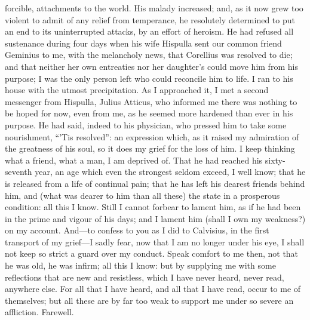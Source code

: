 forcible, attachments to the world. His malady increased; and, as it now
grew too violent to admit of any relief from temperance, he resolutely
determined to put an end to its uninterrupted attacks, by an effort of
heroism. He had refused all sustenance during four days when his wife
Hispulla sent our common friend Geminius to me, with the melancholy news,
that Corellius was resolved to die; and that neither her own entreaties
nor her daughter's could move him from his purpose; I was the only person
left who could reconcile him to life. I ran to his house with the utmost
precipitation. As I approached it, I met a second messenger from Hispulla,
Julius Atticus, who informed me there was nothing to be hoped for now,
even from me, as he seemed more hardened than ever in his purpose. He had
said, indeed to his physician, who pressed him to take some nourishment,
``'Tis resolved'': an expression which, as it raised my admiration of the
greatness of his soul, so it does my grief for the loss of him. I keep
thinking what a friend, what a man, I am deprived of. That he had reached
his sixty-seventh year, an age which even the strongest seldom exceed, I
well know; that he is released from a life of continual pain; that he has
left his dearest friends behind him, and (what was dearer to him than all
these) the state in a prosperous condition: all this I know. Still I
cannot forbear to lament him, as if he had been in the prime and vigour of
his days; and I lament him (shall I own my weakness?) on my account. And—to
confess to you as I did to Calvisius, in the first transport of my grief—I
sadly fear, now that I am no longer under his eye, I shall not keep so
strict a guard over my conduct. Speak comfort to me then, not that he was
old, he was infirm; all this I know: but by supplying me with some
reflections that are new and resistless, which I have never heard, never
read, anywhere else. For all that I have heard, and all that I have read,
occur to me of themselves; but all these are by far too weak to support me
under so severe an affliction. Farewell.


